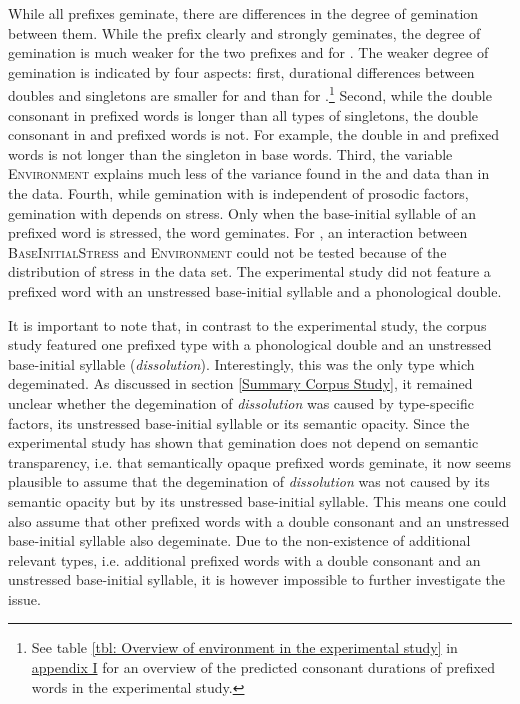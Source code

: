 While all prefixes geminate, there are differences in the degree of gemination between them. While the prefix  clearly and strongly geminates, the degree of gemination is much weaker for the two prefixes and for . The weaker degree of gemination is indicated by four aspects: first, durational differences between doubles and singletons are smaller for  and  than for .\footnote{See table \ref{tbl: Overview of environment in the experimental study} in \hyperref[Appendix I: Predicted Durations Experiment]{appendix I} for an overview of the predicted consonant durations of prefixed words in the experimental study.} Second, while the double consonant in prefixed words is longer than all types of singletons, the double consonant in  and prefixed words is not. For example, the double in  and prefixed words is not longer than the singleton in base words. Third, the variable \textsc{Environment} explains much less of the variance found in the  and data than in the data. 
Fourth, while gemination with  is independent of prosodic factors, gemination with  depends on stress. Only when the base-initial syllable of an prefixed word is stressed, the word geminates. For , an interaction between \textsc{BaseInitialStress} and \textsc{Environment} could not be tested because of the distribution of stress in the data set. The experimental study did not feature a prefixed word with an unstressed base-initial syllable and a phonological double.

It is important to note that, in contrast to the experimental study, the corpus study featured one prefixed type with a phonological double and an unstressed base-initial syllable (\textit{dissolution}). Interestingly, this was the only type which degeminated. As discussed in section \ref{Summary Corpus Study}, it remained unclear whether the degemination of \textit{dissolution} was caused by type-specific factors, its unstressed base-initial syllable or its semantic opacity.
Since the experimental study has shown that gemination does not depend on semantic transparency, i.e. that semantically opaque prefixed words geminate,  it now seems plausible to assume that the degemination of \textit{dissolution} was not  caused by its semantic opacity but by its unstressed base-initial syllable. This means one could also assume that other prefixed words with a double consonant and an unstressed base-initial syllable also degeminate. Due to the non-existence of additional relevant types, i.e. additional prefixed words with a double consonant and an unstressed base-initial syllable, it is however impossible to further investigate the issue. 




